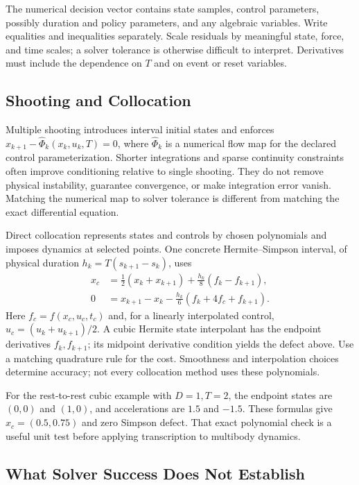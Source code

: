 \documentclass[12pt, openany]{book}
\theoremstyle{plain}
\begin{document}
The numerical decision vector contains state samples, control parameters,
possibly duration and policy parameters, and any algebraic variables. Write
equalities and inequalities separately. Scale residuals by meaningful state,
force, and time scales; a solver tolerance is otherwise difficult to interpret.
Derivatives must include the dependence on $T$ and on event or reset variables.

\subsection{Shooting and Collocation}

Multiple shooting introduces interval initial states and enforces
$x_{k+1}-\widehat\Phi_k(x_k,u_k,T)=0$, where $\widehat\Phi_k$ is a numerical
flow map for the declared control parameterization. Shorter integrations
and sparse continuity constraints often improve conditioning relative to
single shooting. They do not remove physical instability, guarantee convergence,
or make integration error vanish. Matching the numerical map to solver
tolerance is different from matching the exact differential equation.

Direct collocation represents states and controls by chosen polynomials
and imposes dynamics at selected points. One concrete Hermite--Simpson
interval, of physical duration $h_k=T(s_{k+1}-s_k)$, uses
\begin{equation}\label{eq:hermite_simpson}
 \begin{aligned}
 x_c&=\tfrac12(x_k+x_{k+1})+\tfrac{h_k}{8}(f_k-f_{k+1}),\\
 0&=x_{k+1}-x_k-\tfrac{h_k}{6}(f_k+4f_c+f_{k+1}).
 \end{aligned}
\end{equation}
Here $f_c=f(x_c,u_c,t_c)$ and, for a linearly interpolated control,
$u_c=(u_k+u_{k+1})/2$. A cubic Hermite state interpolant has the endpoint
derivatives $f_k,f_{k+1}$; its midpoint derivative condition yields the defect
above. Use a matching quadrature rule for the cost. Smoothness and interpolation
choices determine accuracy; not every collocation method uses these polynomials.

For the rest-to-rest cubic example with $D=1,T=2$, the endpoint states are
$(0,0)$ and $(1,0)$, and accelerations are $1.5$ and $-1.5$. These formulas
give $x_c=(0.5,0.75)$ and zero Simpson defect. That exact polynomial check
is a useful unit test before applying transcription to multibody dynamics.

\subsection{What Solver Success Does Not Establish}
\end{document}
